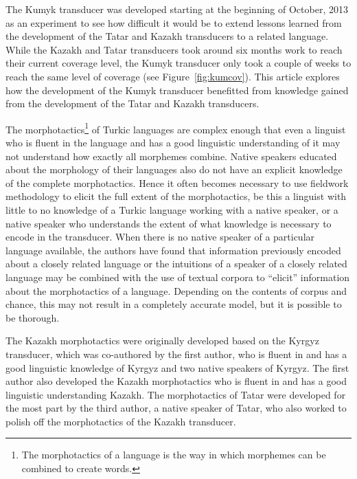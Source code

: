 \documentclass[a4paper,11pt,twocolumn]{article}
\begin{document}
The Kumyk transducer was developed starting at the beginning of October, 2013 as an experiment to see how difficult it would be to extend lessons learned from the development of the Tatar and Kazakh transducers to a related language.  While the Kazakh and Tatar transducers took around six months work to reach their current coverage level, the Kumyk transducer only took a couple of weeks to reach the same level of coverage (see Figure~\ref{fig:kumcov}).  This article explores how the development of the Kumyk transducer benefitted from knowledge gained from the development of the Tatar and Kazakh transducers.

The morphotactics\footnote{The morphotactics of a language is the way in which morphemes can be combined to create words.} of Turkic languages are complex enough that even a linguist who is fluent in the language and has a good linguistic understanding of it may not understand how exactly all morphemes combine.  Native speakers educated about the morphology of their languages also do not have an explicit knowledge of the complete morphotactics.  Hence it often becomes necessary to use fieldwork methodology to elicit the full extent of the morphotactics, be this a linguist with little to no knowledge of a Turkic language working with a native speaker, or a native speaker who understands the extent of what knowledge is necessary to encode in the transducer.  When there is no native speaker of a particular language available, the authors have found that information previously encoded about a closely related language or the intuitions of a speaker of a closely related language may be combined with the use of textual corpora to ``elicit'' information about the morphotactics of a language.  Depending on the contents of corpus and chance, this may not result in a completely accurate model, but it is possible to be thorough.

The Kazakh morphotactics were originally developed based on the Kyrgyz transducer, which was co-authored by the first author, who is fluent in and has a good linguistic knowledge of Kyrgyz and two native speakers of Kyrgyz. The first author also developed the Kazakh morphotactics who is fluent in and has a good linguistic understanding Kazakh.  The morphotactics of Tatar were developed for the most part by the third author, a native speaker of Tatar, who also worked to polish off the morphotactics of the Kazakh transducer.

\end{document}
